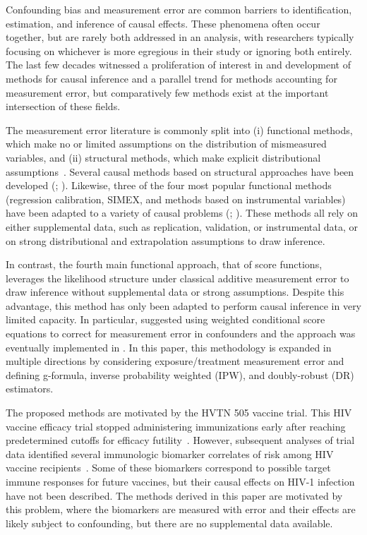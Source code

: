 \documentclass[useAMS,usenatbib,referee]{biom}
\begin{document}
Confounding bias and measurement error are common barriers to identification, estimation, and inference of causal effects. These phenomena often occur together, but are rarely both addressed in an analysis, with researchers typically focusing on whichever is more egregious in their study or ignoring both entirely. The last few decades witnessed a proliferation of interest in and development of methods for causal inference and a parallel trend for methods accounting for measurement error, but comparatively few methods exist at the important intersection of these fields.

The measurement error literature is commonly split into (i) functional methods, which make no or limited assumptions on the distribution of mismeasured variables, and (ii) structural methods, which make explicit distributional assumptions~\citep{carroll2006}. Several causal methods based on structural approaches have been developed (\citealp{kuroki2014,edwards2015multiple,braun2017}; \citealp*{hong2017}). Likewise, three of the four most popular functional methods (regression calibration, SIMEX, and methods based on instrumental variables) have been adapted to a variety of causal problems (\citealp*{vansteelandt2009}; \citealp{cole2010,kendall2015,lockwood2015,kyle2016,wu2019}). These methods all rely on either supplemental data, such as replication, validation, or instrumental data, or on strong distributional and extrapolation assumptions to draw inference.

In contrast, the fourth main functional approach, that of score functions, leverages the likelihood structure under classical additive measurement error to draw inference without supplemental data or strong assumptions. Despite this advantage, this method has only been adapted to perform causal inference in very limited capacity. In particular, \citet*{mccaffrey2013} suggested using weighted conditional score equations to correct for measurement error in confounders and the approach was eventually implemented in \citet{shu2019}. In this paper, this methodology is expanded in multiple directions by considering exposure/treatment measurement error and defining g-formula, inverse probability weighted (IPW), and doubly-robust (DR) estimators.

The proposed methods are motivated by the HVTN 505 vaccine trial. This HIV vaccine efficacy trial stopped administering immunizations early after reaching predetermined cutoffs for efficacy futility~\citep{hammer2013}. However, subsequent analyses of trial data identified several immunologic biomarker correlates of risk among HIV vaccine recipients~\citep{janes2017,fong2018,neidich2019}. Some of these biomarkers correspond to possible target immune responses for future vaccines, but their causal effects on HIV-1 infection have not been described. The methods derived in this paper are motivated by this problem, where the biomarkers are measured with error and their effects are likely subject to confounding, but there are no supplemental data available.
\end{document}
